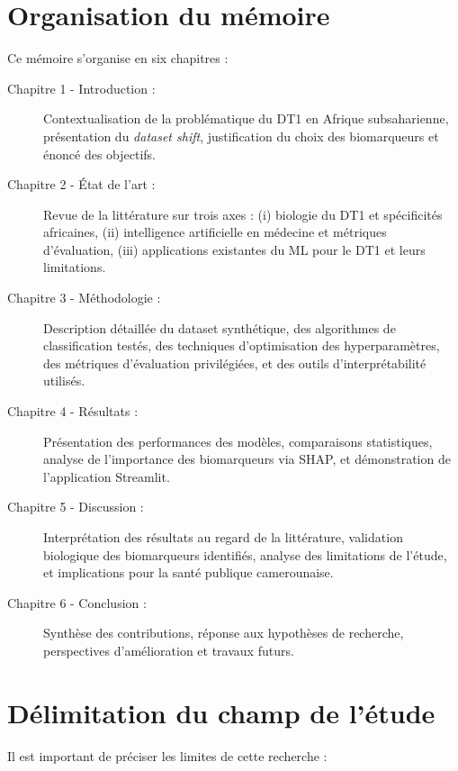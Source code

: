 \section{Organisation du mémoire}

Ce mémoire s'organise en six chapitres :

\begin{description}
    \item[Chapitre 1 - Introduction :] Contextualisation de la problématique du DT1 en Afrique subsaharienne, présentation du \textit{dataset shift}, justification du choix des biomarqueurs et énoncé des objectifs.

    \item[Chapitre 2 - État de l'art :] Revue de la littérature sur trois axes : (i) biologie du DT1 et spécificités africaines, (ii) intelligence artificielle en médecine et métriques d'évaluation, (iii) applications existantes du ML pour le DT1 et leurs limitations.

    \item[Chapitre 3 - Méthodologie :] Description détaillée du dataset synthétique, des algorithmes de classification testés, des techniques d'optimisation des hyperparamètres, des métriques d'évaluation privilégiées, et des outils d'interprétabilité utilisés.

    \item[Chapitre 4 - Résultats :] Présentation des performances des modèles, comparaisons statistiques, analyse de l'importance des biomarqueurs via SHAP, et démonstration de l'application Streamlit.

    \item[Chapitre 5 - Discussion :] Interprétation des résultats au regard de la littérature, validation biologique des biomarqueurs identifiés, analyse des limitations de l'étude, et implications pour la santé publique camerounaise.

    \item[Chapitre 6 - Conclusion :] Synthèse des contributions, réponse aux hypothèses de recherche, perspectives d'amélioration et travaux futurs.
\end{description}

\section{Délimitation du champ de l'étude}

Il est important de préciser les limites de cette recherche :

